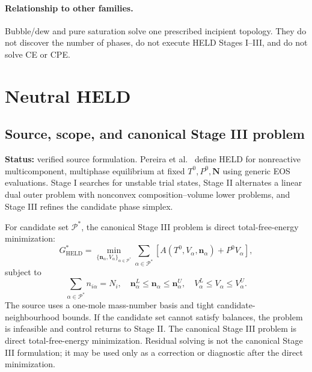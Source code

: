 \documentclass[11pt]{article}
\newcommand{\Evidence}[1]{\textsf{#1}}
\newcommand{\Status}[1]{\textbf{Status:} \Evidence{#1}.}
\begin{document}
\paragraph{Relationship to other families.}
Bubble/dew and pure saturation solve one prescribed incipient topology. They do
not discover the number of phases, do not execute HELD Stages I--III, and do
not solve CE or CPE.

\section{Neutral HELD}
\label{sec:eqform:neutral-held}

\subsection{Source, scope, and canonical Stage III problem}

\Status{verified source formulation}
Pereira et al.~\cite{Pereira2012} define HELD for nonreactive multicomponent,
multiphase equilibrium at fixed \(T^0,P^0,\boldsymbol N\) using generic EOS
evaluations. Stage I searches for unstable trial states, Stage II alternates a
linear dual outer problem with nonconvex composition--volume lower problems,
and Stage III refines the candidate phase simplex.

For candidate set \(\mathcal P^*\), the canonical Stage III problem is direct
total-free-energy minimization:
\begin{equation}
 G_{\mathrm{HELD}}^{*}=
 \min_{\{\boldsymbol n_\alpha,V_\alpha\}_{\alpha\in\mathcal P^*}}
 \sum_{\alpha\in\mathcal P^*}
 \left[A(T^0,V_\alpha,\boldsymbol n_\alpha)+P^0V_\alpha\right],
\label{eq:eqform:held-stage-three}
\end{equation}
subject to
\begin{equation}
 \sum_{\alpha\in\mathcal P^*}n_{i\alpha}=N_i,\quad
 \boldsymbol n_\alpha^{L}\leq\boldsymbol n_\alpha\leq
 \boldsymbol n_\alpha^{U},\quad
 V_\alpha^{L}\leq V_\alpha\leq V_\alpha^{U}.
\label{eq:eqform:held-stage-three-constraints}
\end{equation}
The source uses a one-mole mass-number basis and tight candidate-neighbourhood
bounds. If the candidate set cannot satisfy balances, the problem is
infeasible and control returns to Stage II. The canonical Stage III problem is
direct total-free-energy minimization. Residual solving is not the canonical
Stage III formulation; it may be used only as a correction or diagnostic after
the direct minimization.
\end{document}

